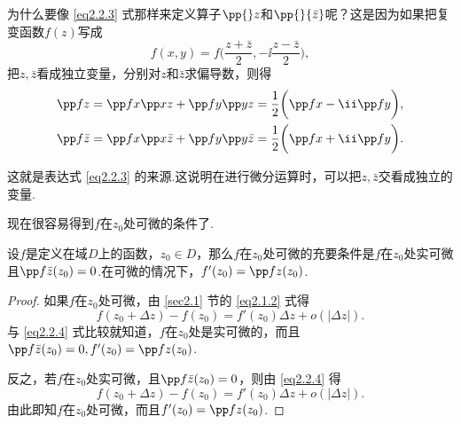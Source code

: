 为什么要像 \eqref{eq2.2.3} 式那样来定义算子$\pp{}z$和$\pp{}{\bar z}$呢？这是因为如果把复变函数$f(z)$写成
\[f(x,y)=f\bigg(\frac{z+\bar z}2,-\ii\frac{z-\bar z}2\bigg),\]
把$z,\bar z$看成独立变量，分别对$z$和$\bar z$求偏导数，则得
\begin{gather*}
\pp fz=\pp fx\pp xz+\pp fy\pp yz=\frac12\bigg(\pp fx-\ii\pp fy\bigg),\\
\pp f{\bar z}=\pp fx\pp x{\bar z}+\pp fy\pp y{\bar z}=\frac12\bigg(\pp fx+\ii\pp fy\bigg).
\end{gather*}

这就是表达式 \eqref{eq2.2.3} 的来源.这说明在进行微分运算时，可以把$z,\bar z$交看成独立的变量.

现在很容易得到$f$在$z_0$处可微的条件了.
\begin{theorem}\label{thm2.2.3}
设$f$是定义在域$D$上的函数，$z_0\in D$，那么$f$在$z_0$处可微的充要条件是$f$在$z_0$处实可微且$\pp f{\bar z}(z_0)=0$.在可微的情况下，$f'(z_0)=\pp fz(z_0)$.
\end{theorem}
\begin{proof}
如果$f$在$z_0$处可微，由 \ref{sec2.1} 节的 \eqref{eq2.1.2} 式得
\[f(z_0+\Delta z)-f(z_0)=f'(z_0)\Delta z+o(|\Delta z|).\]
与 \eqref{eq2.2.4} 式比较就知道，$f$在$z_0$处是实可微的，而且$\pp f{\bar z}(z_0)=0,f'(z_0)=\pp fz(z_0)$.

反之，若$f$在$z_0$处实可微，且$\pp f{\bar z}(z_0)=0$，则由 \eqref{eq2.2.4} 得
\[f(z_0+\Delta z)-f(z_0)=f'(z_0)\Delta z+o(|\Delta z|).\]
由此即知$f$在$z_0$处可微，而且$f'(z_0)=\pp fz(z_0)$.
\end{proof}


